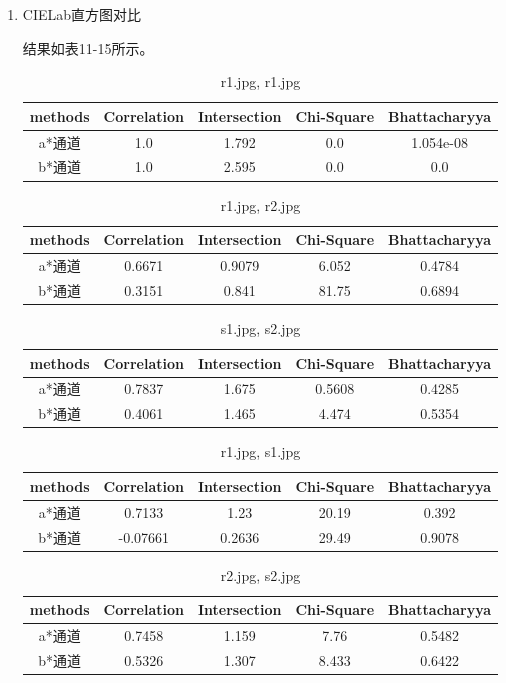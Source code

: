 \documentclass[a4paper, 12pt, UTF8]{article}
\begin{document}
\begin{enumerate}
\item CIELab直方图对比

结果如表11-15所示。

\begin{table}[h!]
    \centering
    \caption{r1.jpg, r1.jpg}
    \begin{tabular}{ccccc}
        methods & Correlation & Intersection & Chi-Square & Bhattacharyya \\ \hline
        a*通道 & 1.0 & 1.792 & 0.0 & 1.054e-08 \\
        b*通道 & 1.0 & 2.595 & 0.0 & 0.0 \\
    \end{tabular}
\end{table}
\begin{table}[h!]
    \centering
    \caption{r1.jpg, r2.jpg}
    \begin{tabular}{ccccc}
        methods & Correlation & Intersection & Chi-Square & Bhattacharyya \\ \hline
        a*通道 & 0.6671 & 0.9079 & 6.052 & 0.4784 \\
        b*通道 & 0.3151 & 0.841 & 81.75 & 0.6894 \\
    \end{tabular}
\end{table}
\begin{table}[h!]
    \centering
    \caption{s1.jpg, s2.jpg}
    \begin{tabular}{ccccc}
        methods & Correlation & Intersection & Chi-Square & Bhattacharyya \\ \hline
        a*通道 & 0.7837 & 1.675 & 0.5608 & 0.4285 \\
        b*通道 & 0.4061 & 1.465 & 4.474 & 0.5354 \\
    \end{tabular}
\end{table}
\begin{table}[h!]
    \centering
    \caption{r1.jpg, s1.jpg}
    \begin{tabular}{ccccc}
        methods & Correlation & Intersection & Chi-Square & Bhattacharyya \\ \hline
        a*通道 & 0.7133 & 1.23 & 20.19 & 0.392 \\
        b*通道 & -0.07661 & 0.2636 & 29.49 & 0.9078 \\
    \end{tabular}
\end{table}
\begin{table}[h!]
    \centering
    \caption{r2.jpg, s2.jpg}
    \begin{tabular}{ccccc}
        methods & Correlation & Intersection & Chi-Square & Bhattacharyya \\ \hline
        a*通道 & 0.7458 & 1.159 & 7.76 & 0.5482 \\
        b*通道 & 0.5326 & 1.307 & 8.433 & 0.6422 \\
    \end{tabular}
\end{table}


\end{enumerate}
\end{document}
